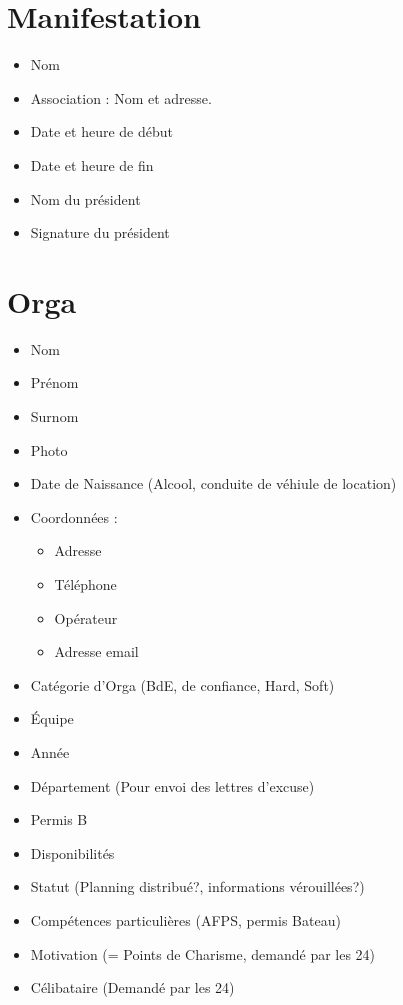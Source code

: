 \section{Manifestation}
\begin{itemize}
 \item Nom
\item Association : Nom et adresse.
\item Date et heure de début
\item Date et heure de fin
\item Nom du président
\item Signature du président

\end{itemize}

\section{Orga}
\begin{itemize}
 \item Nom
\item Prénom
\item Surnom
\item Photo

\item Date de Naissance (Alcool, conduite de véhiule de location)

\item Coordonnées : \begin{itemize}
                     \item Adresse
\item Téléphone
\item Opérateur
\item Adresse email
                    \end{itemize}
\item Catégorie d'Orga (BdE, de confiance, Hard, Soft)
\item Équipe 
\item Année
\item Département (Pour envoi des lettres d'excuse)
\item Permis B

\item Disponibilités
\item Statut (Planning distribué?, informations vérouillées?)
\item Compétences particulières (AFPS, permis Bateau)

\item Motivation (= Points de Charisme, demandé par les 24)
\item Célibataire (Demandé par les 24)

\end{itemize}

